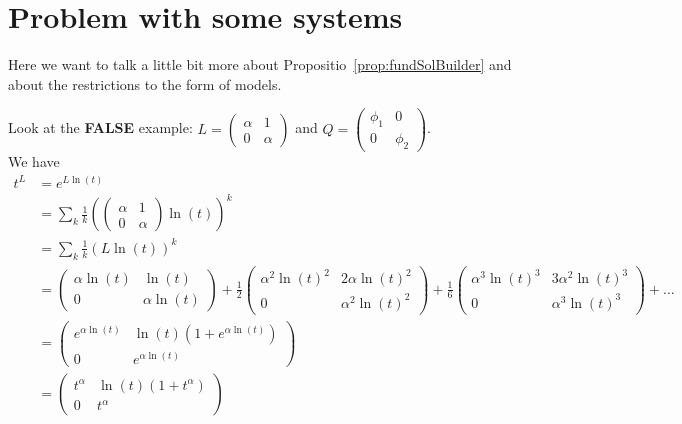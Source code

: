 \chapter{Problem with some systems}
Here we want to talk a little bit more about
Propositio~\ref{prop:fundSolBuilder} and about the restrictions to the form of
models.

\PROBLEM[remove?]
Look at the \textbf{FALSE} example:
$L=\begin{pmatrix} \alpha & 1 \\ 0 & \alpha \end{pmatrix}$
and $Q=\begin{pmatrix} \phi_1 & 0 \\ 0 & \phi_2 \end{pmatrix}$.
\\We have
\begin{align*}
  t^L&=e^{L\ln(t)}
  \\&=\sum_k\frac{1}{k}\left(\begin{pmatrix}
      \alpha & 1 \\ 0 & \alpha
     \end{pmatrix}\ln(t)\right)^k
  \\&=\sum_k\frac{1}{k}\left(L\ln(t)\right)^k
  \\&=
    \begin{pmatrix}
      \alpha\ln(t) & \ln(t) \\ 0 & \alpha\ln(t)
    \end{pmatrix}
    +
    \frac{1}{2}\begin{pmatrix}
      \alpha^2\ln(t)^2 & 2\alpha\ln(t)^2 \\ 0 & \alpha^2\ln(t)^2
    \end{pmatrix}
    +
    \frac{1}{6}\begin{pmatrix}
      \alpha^3\ln(t)^3 & 3\alpha^2\ln(t)^3 \\ 0 & \alpha^3\ln(t)^3
    \end{pmatrix}
    +\dots
  \\&=
    \begin{pmatrix}
      e^{\alpha\ln(t)} & \ln(t)(1+e^{\alpha\ln(t)}) \\ 0 & e^{\alpha\ln(t)}
    \end{pmatrix}
  \\&=
    \begin{pmatrix}
      t^\alpha & \ln(t)(1+t^\alpha) \\ 0 & t^\alpha
    \end{pmatrix}
\end{align*}

